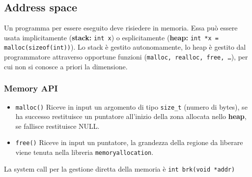 \documentclass[12pt, twoside, letterpaper]{article}
\begin{document}
		
		\subsection{Address space}
			Un programma per essere eseguito deve risiedere in memoria. Essa può essere usata implicitamente (\textbf{stack:} \texttt{int x}) o esplicitamente (\textbf{heap:} \texttt{int *x = malloc(sizeof(int))}). Lo stack è gestito autonomamente, lo heap è gestito dal programmatore attraverso opportune funzioni (\texttt{malloc, realloc, free, \dots}), per cui non si conosce a priori la dimensione.
			
			\subsubsection{Memory API}
				\begin{itemize}
					\item \texttt{malloc()} Riceve in input un argomento di tipo \texttt{size\_t} (numero di bytes), se ha successo restituisce un puntatore all'inizio della zona allocata nello \textbf{heap}, se fallisce restituisce NULL.
					\item \texttt{free()} Riceve in input un puntatore, la grandezza della regione da liberare viene tenuta nella libreria \texttt{memoryallocation}.
				\end{itemize}
				La system call per la gestione diretta della memoria è \texttt{int brk(void *addr)}
				
\end{document}
